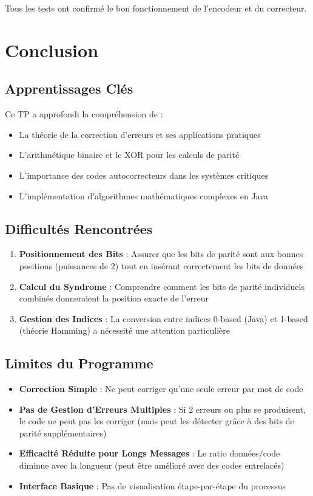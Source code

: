 \documentclass[12pt, a4paper]{article}
\begin{document}
Tous les tests ont confirmé le bon fonctionnement de l'encodeur et du correcteur.

\section{Conclusion}

\subsection{Apprentissages Clés}

Ce TP a approfondi la compréhension de :

\begin{itemize}
    \item La théorie de la correction d'erreurs et ses applications pratiques
    \item L'arithmétique binaire et le XOR pour les calculs de parité
    \item L'importance des codes autocorrecteurs dans les systèmes critiques
    \item L'implémentation d'algorithmes mathématiques complexes en Java
\end{itemize}

\subsection{Difficultés Rencontrées}

\begin{enumerate}
    \item \textbf{Positionnement des Bits} : Assurer que les bits de parité sont aux bonnes positions (puissances de 2) tout en insérant correctement les bits de données
    \item \textbf{Calcul du Syndrome} : Comprendre comment les bits de parité individuels combinés donneraient la position exacte de l'erreur
    \item \textbf{Gestion des Indices} : La conversion entre indices 0-based (Java) et 1-based (théorie Hamming) a nécessité une attention particulière
\end{enumerate}

\subsection{Limites du Programme}

\begin{itemize}
    \item \textbf{Correction Simple} : Ne peut corriger qu'une seule erreur par mot de code
    \item \textbf{Pas de Gestion d'Erreurs Multiples} : Si 2 erreurs ou plus se produisent, le code ne peut pas les corriger (mais peut les détecter grâce à des bits de parité supplémentaires)
    \item \textbf{Efficacité Réduite pour Longs Messages} : Le ratio données/code diminue avec la longueur (peut être amélioré avec des codes entrelacés)
    \item \textbf{Interface Basique} : Pas de visualisation étape-par-étape du processus
\end{itemize}
\end{document}
